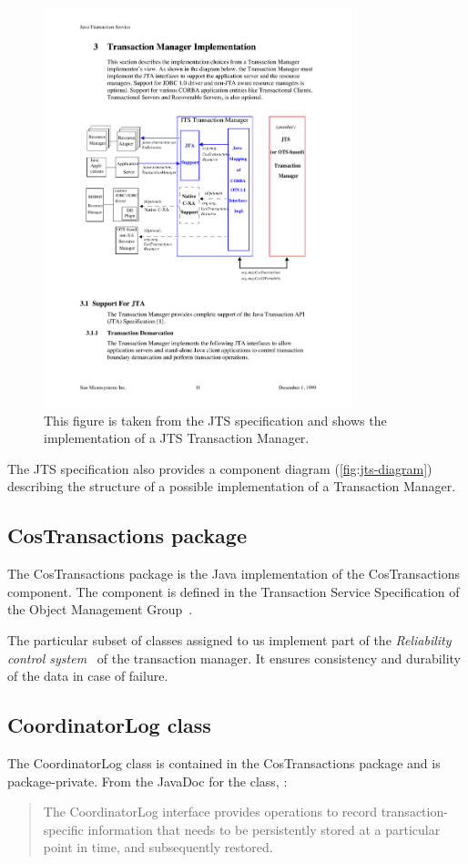 \begin{figure}
\centering
\includegraphics[width=0.8\textwidth]{figures/JTSDiagram}
\caption{This figure is taken from the JTS specification and shows the implementation of a JTS Transaction Manager.}
\label{fig:jts-diagram}
\end{figure}

The JTS specification also provides a component diagram (\autoref{fig:jts-diagram}) describing the structure of a possible implementation of a Transaction Manager.

\subsection{CosTransactions package}
The CosTransactions package is the Java implementation of the CosTransactions component. The component is defined in the Transaction Service Specification of the Object Management Group~\cite{omg-ots}.

The particular subset of classes assigned to us implement part of the \emph{Reliability control system}~\cite[p.~311]{ceri-dbbook} of the transaction manager. 
It ensures consistency and durability of the data in case of failure.

\subsection{CoordinatorLog class}
The CoordinatorLog class is contained in the CosTransactions package and is package-private. From the JavaDoc for the class, :
\begin{quote}
    The CoordinatorLog interface provides operations to record transaction-specific information that needs to be persistently stored at a particular point in time, and subsequently restored.
\end{quote}

